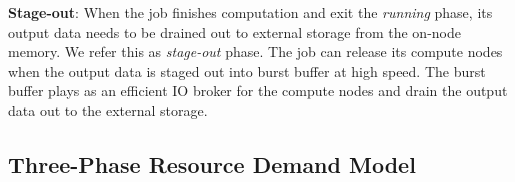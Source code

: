 \textbf{Stage-out}: When the job finishes computation and
         exit the \textit{running} phase, its output data needs to be drained out
         to external storage from the on-node memory. We refer this as \textit{stage-out} phase.
         The job can release its compute nodes when the output data is staged out
         into burst buffer at high speed. The burst buffer plays as an efficient
         IO broker for the compute nodes and drain the output data out to the external storage.



\subsection{Three-Phase Resource Demand Model}

